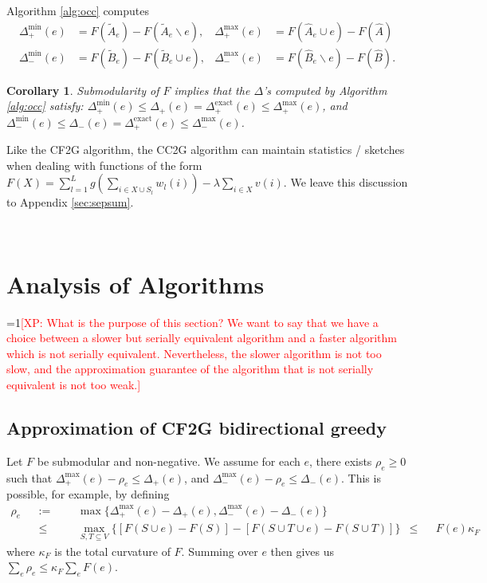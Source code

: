 \documentclass{article} %
\newcommand{\hogwild}{CF2G}
\newcommand{\occ}{CC2G}
\newtheorem{cor}[thm]{Corollary}
\newcommand{\Comments}{1}
\newcommand{\note}[2]{\ifnum\Comments=1\textcolor{#1}{#2}\fi}
\newcommand{\xinghao}[1]{\note{red}{[XP: #1]}}
\begin{document}
Algorithm \ref{alg:occ} computes
\begin{align*}
  \Delta_+^{\min}(e) &= F(\tilde{A}_e) - F(\tilde{A}_e \backslash e),
& \Delta_+^{\max}(e) &= F(\hat{A}_e \cup e) - F(\hat{A})\\
  \Delta_-^{\min}(e) &= F(\tilde{B}_e) - F(\tilde{B}_e \cup e),
& \Delta_-^{\max}(e) &= F(\hat{B}_e \backslash e) - F(\hat{B}).
\end{align*}

\begin{cor}\label{cor:occ:delta_bound} Submodularity of $F$ implies that the $\Delta$'s computed by Algorithm \ref{alg:occ} satisfy: $\Delta_+^{\min}(e) \leq \Delta_+(e) = \Delta_+^{\text{exact}}(e) \leq \Delta_+^{\max}(e)$, and $\Delta_-^{\min}(e) \leq \Delta_-(e) = \Delta_+^{\text{exact}}(e) \leq \Delta_-^{\max}(e)$.
\end{cor}

Like the \hogwild{} algorithm, the \occ{} algorithm can maintain statistics / sketches when dealing with functions of the form $F(X) = \sum_{l=1}^L g\left(\sum_{i\in X\cup S_l} w_l(i)\right) - \lambda\sum_{i\in X} v(i)$.
We leave this discussion to Appendix \ref{sec:sepsum}.



~











\section{Analysis of Algorithms}

\xinghao{What is the purpose of this section?
We want to say that we have a choice between a slower but serially equivalent algorithm and a faster algorithm which is not serially equivalent.
Nevertheless, the slower algorithm is not too slow, and the approximation guarantee of the algorithm that is not serially equivalent is not too weak.}


\subsection{Approximation of \hogwild{} bidirectional greedy}
Let $F$ be submodular and non-negative.
We assume for each $e$, there exists $\rho_e \geq 0$ such that
$\Delta_+^{\max}(e) - \rho_e \leq \Delta_+(e)$, and
$\Delta_-^{\max}(e) - \rho_e \leq \Delta_-(e)$.
This is possible, for example, by defining
\begin{align*}
\rho_e
&&:=&&&   \max\{\Delta_+^{\max}(e) - \Delta_+(e), \Delta_-^{\max}(e) - \Delta_-(e)\}\\
&&\leq&&& \max_{S,T\subseteq V} \{[F(S\cup e) - F(S)] - [F(S \cup T \cup e) - F(S \cup T)]\}
&\leq&& F(e)\kappa_F
\end{align*}
where $\kappa_F$ is the total curvature of $F$.
Summing over $e$ then gives us $\sum_e \rho_e \leq \kappa_F\sum_e F(e)$.
\end{document}
